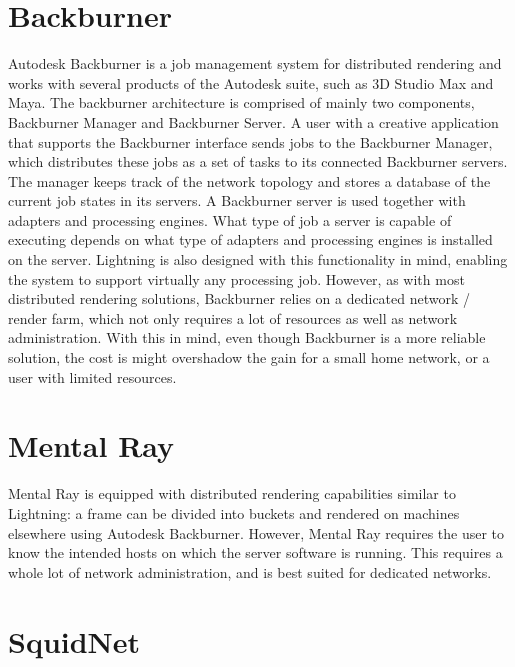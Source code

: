 \section{Backburner}

Autodesk Backburner is a job management system for distributed rendering and works with several products of the Autodesk suite, such as 3D Studio Max and Maya. The backburner architecture is comprised of mainly two components, Backburner Manager and Backburner Server. A user with a creative application that supports the Backburner interface sends jobs to the Backburner Manager, which distributes these jobs as a set of tasks to its connected Backburner servers. The manager keeps track of the network topology and stores a database of the current job states in its servers. A Backburner server is used together with adapters and processing engines. What type of job a server is capable of executing depends on what type of adapters and processing engines is installed on the server. Lightning is also designed with this functionality in mind, enabling the system to support virtually any processing job. However, as with most distributed rendering solutions, Backburner relies on a dedicated network / render farm, which not only requires a lot of resources as well as network administration. With this in mind, even though Backburner is a more reliable solution, the cost is might overshadow the gain for a small home network, or a user with limited resources. 

\section{Mental Ray}


Mental Ray is equipped with distributed rendering capabilities similar to Lightning: a frame can be divided into buckets and rendered on machines elsewhere using Autodesk Backburner. However, Mental Ray requires the user to know the intended hosts on which the server software is running. This requires a whole lot of network administration, and is best suited for dedicated networks. 

\section{SquidNet}

